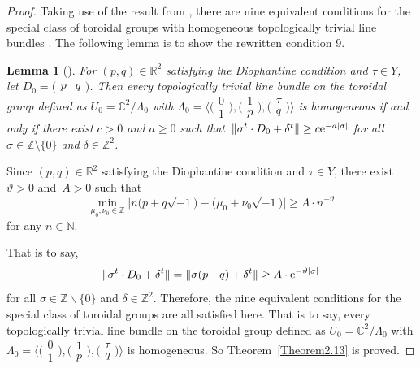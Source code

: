 \documentclass[pdftex]{sigma}
\numberwithin{equation}{section}
\newtheorem{Lemma}[Theorem]{Lemma}
\begin{document}
\begin{proof}
Taking use of the result from \cite{Christian}, there are nine equivalent conditions for the special class of toroidal groups with homogeneous topologically trivial line bundles \cite[Theorem]{Christian}. The following lemma is to show the rewritten condition 9.

\begin{Lemma}[{\cite{Christian}}] \label{Lemma2.14}
 For $(p,q) \in \mathbb{R}^2$ satisfying the Diophantine condition and $\tau \in Y$, let $D_0=\bigl(\begin{matrix}p& q\end{matrix}\bigr)$. Then every topologically trivial line bundle on the toroidal group defined as $U_0=\mathbb{C}^2/\Lambda_0$ with $\Lambda_0=\bigl\langle\bigl(\begin{smallmatrix}0 \\1\end{smallmatrix}\bigr),\bigl(\begin{smallmatrix}1 \\p\end{smallmatrix}\bigr),\bigl(\begin{smallmatrix}\tau \\q\end{smallmatrix}\bigr)\bigr\rangle$ is homogeneous if and only if there exist $ c>0$ and $a \geq 0$ such that~${\|\sigma^t \cdot D_0+ \delta^t\| \geq c{\rm e}^{-a|\sigma|}}$
for all $\sigma \in \mathbb{Z} \setminus \{ 0 \}$ and $\delta \in \mathbb{Z}^2$.
\end{Lemma}

Since $(p,q)\in \mathbb{R}^2$ satisfying the Diophantine condition and $\tau \in Y$, there exist $\vartheta >0$ and~${A>0}$ such that
\[
\underset{\mu_0 ,\nu_0 \in \mathbb{Z}}{\min } \big| n\bigl(p+q\sqrt{-1} \bigr)-\bigl(\mu_0 +\nu_0\sqrt{-1} \bigr)\big| \geq A\cdot n^{-\vartheta }
\]
for any $n \in \mathbb{N}$.

That is to say,
\[\| \sigma^t \cdot D_0+ \delta^t\|=\| \sigma(p\quad q)+ \delta^t\| \geq A\cdot {\rm e}^{-\vartheta|\sigma|}\]
for all $\sigma \in \mathbb{Z} \backslash \{ 0 \}$ and $\delta \in \mathbb{Z}^2$. Therefore, the nine equivalent conditions for the special class of toroidal groups \cite[Theorem]{Christian} are all satisfied here. That is to say, every topologically trivial line bundle on the toroidal group defined as $U_0=\mathbb{C}^2/\Lambda_0$ with $\Lambda_0=\bigl\langle\bigl(\begin{smallmatrix}0 \\1\end{smallmatrix}\bigr),\bigl(\begin{smallmatrix}1 \\p\end{smallmatrix}\bigr),\bigl(\begin{smallmatrix}\tau \\q\end{smallmatrix}\bigr)\bigr\rangle$ is homogeneous. So Theorem~\ref{Theorem2.13} is proved.
\end{proof}
\end{document}
